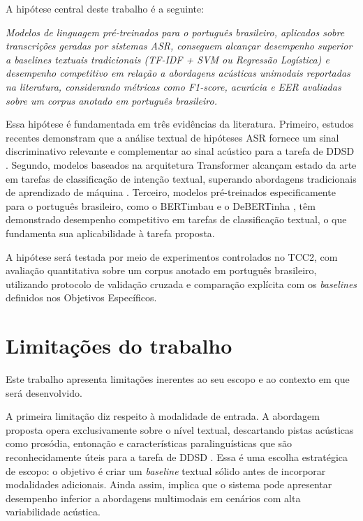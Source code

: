 \documentclass[
    12pt,                %
    openright,           %
    oneside,             %
    a4paper,             %
    english,             %
    brazil               %
]{abntex2}
\begin{document}
A hipótese central deste trabalho é a seguinte:

\textit{Modelos de linguagem pré-treinados para o português brasileiro, aplicados sobre
transcrições geradas por sistemas ASR, conseguem alcançar desempenho superior a
\textit{baselines} textuais tradicionais (TF-IDF + SVM ou Regressão Logística) e
desempenho competitivo em relação a abordagens acústicas unimodais reportadas na
literatura, considerando métricas como F1-score, acurácia e EER avaliadas sobre um
corpus anotado em português brasileiro.}

Essa hipótese é fundamentada em três evidências da literatura. Primeiro, estudos recentes
demonstram que a análise textual de hipóteses ASR fornece um sinal discriminativo
relevante e complementar ao sinal acústico para a tarefa de DDSD \cite{Wagner2024,
Dighe2024}. Segundo, modelos baseados na arquitetura Transformer alcançam estado da arte
em tarefas de classificação de intenção textual, superando abordagens tradicionais de
aprendizado de máquina \cite{Weld2022}. Terceiro, modelos pré-treinados especificamente
para o português brasileiro, como o BERTimbau \cite{Souza2020} e o DeBERTinha
\cite{Abonizio2023}, têm demonstrado desempenho competitivo em tarefas de classificação
textual, o que fundamenta sua aplicabilidade à tarefa proposta.

A hipótese será testada por meio de experimentos controlados no TCC2, com avaliação
quantitativa sobre um corpus anotado em português brasileiro, utilizando protocolo de
validação cruzada e comparação explícita com os \textit{baselines} definidos nos
Objetivos Específicos.

\section{Limitações do trabalho}


Este trabalho apresenta limitações inerentes ao seu escopo e ao contexto em que será
desenvolvido.

A primeira limitação diz respeito à modalidade de entrada. A abordagem proposta opera
exclusivamente sobre o nível textual, descartando pistas acústicas como prosódia,
entonação e características paralinguísticas que são reconhecidamente úteis para a
tarefa de DDSD \cite{Norouzian2019, Krishna2023}. Essa é uma escolha estratégica de
escopo: o objetivo é criar um \textit{baseline} textual sólido antes de incorporar
modalidades adicionais. Ainda assim, implica que o sistema pode apresentar desempenho
inferior a abordagens multimodais em cenários com alta variabilidade acústica.
\end{document}
